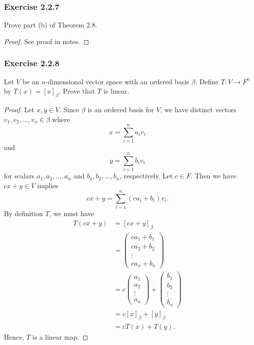 \subsubsection{Exercise 2.2.7} Prove part (b) of Theorem 2.8.
\begin{proof}
See proof in notes.
\end{proof}

\subsubsection{Exercise 2.2.8} Let \( V  \) be an \( n \)-dimensional vector space with an ordered basis \( \beta \). Define \( T: V \to F^{n} \) by \( T(x) = [x]_{\beta}^{}  \). Prove that \( T  \) is linear.
\begin{proof}
    Let \( x,y \in V  \). Since \( \beta \) is an ordered basis for \( V  \), we have distinct vectors \( {v}_{1}, {v}_{2}, \dots, {v}_{n} \in \beta \) where
    \[  x = \sum_{ i=1 }^{ n }{a}_{i} {v}_{i} \]
    and
    \[  y = \sum_{ i=1 }^{ n } {b}_{i} {v}_{i} \] for scalars \( {a}_{1}, {a}_{2}, \dots, {a}_{n}  \) and \( {b}_{1}, {b}_{2}, \dots, {b}_{n}  \), respectively. Let \( c \in F  \). Then we have \( cx + y \in V  \) implies
    \[  cx + y = \sum_{ i=1 }^{ n } (c{a}_{i} + {b}_{i}) {v}_{i}. \]
    By definition \( T  \), we must have 
    \begin{align*}
        T(cx+y) &= [cx+y]_{\beta}^{}  \\
                &= \begin{pmatrix}
                    {ca}_{1} + {b}_{1} \\
                    {ca}_{2} + {b}_{2} \\ 
                    \vdots \\
                    {ca}_{n} + {b}_{n}
                \end{pmatrix} \\
                &= c\begin{pmatrix}
                    {a}_{1} \\
                    {a}_{2} \\
                    \vdots \\
                    {a}_{n}
                \end{pmatrix} + \begin{pmatrix}
                    {b}_{1} \\
                    {b}_{2} \\
                    \vdots \\
                    {b}_{n}
                \end{pmatrix} \\
                &= c {[x]}_{\beta} + {[y]}_{\beta} \\
                &= cT(x) + T(y).
    \end{align*}
    Hence, \( T  \) is a linear map.

\end{proof}

